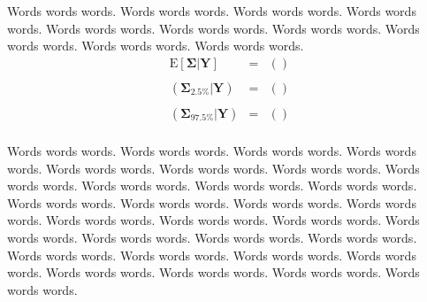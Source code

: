 \documentclass{../../tex_template/asaproc}
\newcommand{\p}[1]{\left(#1\right)}
\newcommand{\E}{ \text{E} }
\begin{document}
Words words words.  Words words words.  Words words words.  Words words words.  Words words words.
Words words words.  Words words words.  Words words words.  Words words words.  Words words words.
\[
\begin{array}{lll}
  \E[\bm\Sigma | \bm Y] &=& \p{} \\
    \\
  (\bm\Sigma_{2.5\%}| \bm Y) &=& \p{} \\
    \\
    (\bm\Sigma_{97.5\%} | \bm Y) &=& \p{} \\
\end{array}
\]



Words words words.  Words words words.  Words words words.  Words words words.  Words words words.
Words words words.  Words words words.  Words words words.  Words words words.  Words words words.
Words words words.  Words words words.  Words words words.  Words words words.  Words words words.
Words words words.  Words words words.  Words words words.  Words words words.  Words words words.
Words words words.  Words words words.  Words words words.  Words words words.  Words words words.
Words words words.  Words words words.  Words words words.  Words words words.  Words words words.
\end{document}
